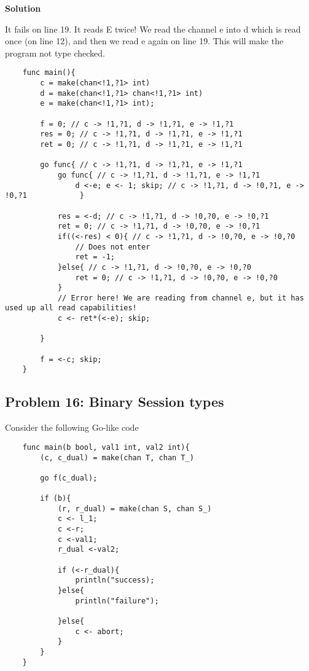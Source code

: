 \textbf{Solution}

It fails on line 19. It reads E twice! We read the channel e into d which is read once (on line 12), and then we read e again on line 19. 
This will make the program not type checked. 

\begin{lstlisting}
    func main(){
        c = make(chan<!1,?1> int)
        d = make(chan<!1,?1> chan<!1,?1> int)
        e = make(chan<!1,?1> int);

        f = 0; // c -> !1,?1, d -> !1,?1, e -> !1,?1
        res = 0; // c -> !1,?1, d -> !1,?1, e -> !1,?1
        ret = 0; // c -> !1,?1, d -> !1,?1, e -> !1,?1

        go func{ // c -> !1,?1, d -> !1,?1, e -> !1,?1
            go func{ // c -> !1,?1, d -> !1,?1, e -> !1,?1
                d <-e; e <- 1; skip; // c -> !1,?1, d -> !0,?1, e -> !0,?1            }

            res = <-d; // c -> !1,?1, d -> !0,?0, e -> !0,?1
            ret = 0; // c -> !1,?1, d -> !0,?0, e -> !0,?1
            if((<-res) < 0){ // c -> !1,?1, d -> !0,?0, e -> !0,?0
                // Does not enter
                ret = -1;
            }else{ // c -> !1,?1, d -> !0,?0, e -> !0,?0
                ret = 0; // c -> !1,?1, d -> !0,?0, e -> !0,?0
            }
            // Error here! We are reading from channel e, but it has used up all read capabilities!
            c <- ret*(<-e); skip;
            
        }

        f = <-c; skip;
    }
\end{lstlisting}


\subsection{Problem 16: Binary Session types}

Consider the following Go-like code

\begin{lstlisting}
    func main(b bool, val1 int, val2 int){
        (c, c_dual) = make(chan T, chan T_)
        
        go f(c_dual);

        if (b){
            (r, r_dual) = make(chan S, chan S_)
            c <- l_1; 
            c <-r; 
            c <-val1; 
            r_dual <-val2;

            if (<-r_dual){
                println("success);
            }else{
                println("failure");

            }else{
                c <- abort; 
            }
        }
    }
\end{lstlisting}



